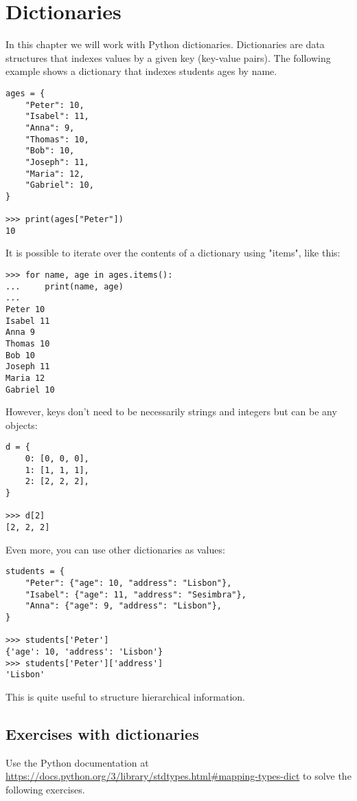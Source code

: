\chapter{Dictionaries}\label{dictionaries}

In this chapter we will work with Python dictionaries. Dictionaries are data structures that indexes values by a given key (key-value pairs). The following example shows a dictionary that indexes students ages by name.

\begin{lstlisting}
ages = {
    "Peter": 10,
    "Isabel": 11,
    "Anna": 9,
    "Thomas": 10,
    "Bob": 10,
    "Joseph": 11,
    "Maria": 12,
    "Gabriel": 10,
}

>>> print(ages["Peter"])
10
\end{lstlisting}

It is possible to iterate over the contents of a dictionary using "items", like this:

\begin{lstlisting}
>>> for name, age in ages.items():
...     print(name, age)
... 
Peter 10
Isabel 11
Anna 9
Thomas 10
Bob 10
Joseph 11
Maria 12
Gabriel 10
\end{lstlisting}

However, keys don't need to be necessarily strings and integers but can be any objects:

\begin{lstlisting}
d = {
    0: [0, 0, 0],
    1: [1, 1, 1],
    2: [2, 2, 2],
}

>>> d[2]
[2, 2, 2]
\end{lstlisting}

Even more, you can use other dictionaries as values:

\begin{lstlisting}
students = {
    "Peter": {"age": 10, "address": "Lisbon"},
    "Isabel": {"age": 11, "address": "Sesimbra"},
    "Anna": {"age": 9, "address": "Lisbon"},
}

>>> students['Peter']
{'age': 10, 'address': 'Lisbon'}
>>> students['Peter']['address']
'Lisbon'
\end{lstlisting}

This is quite useful to structure hierarchical information. 

\section{Exercises with dictionaries}

Use the Python documentation at \url{https://docs.python.org/3/library/stdtypes.html#mapping-types-dict} to solve the following exercises.

